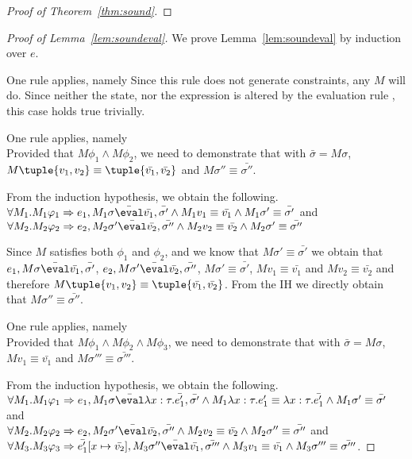

\begin{proof}[Proof of Theorem~\ref{thm:sound}]
\end{proof}

\begin{proof}[Proof of Lemma~\ref{lem:soundeval}]
  We prove Lemma~\ref{lem:soundeval} by induction over $e$.

  {One rule applies, namely 
  Since this rule does not generate constraints, any $M$ will do.
  Since neither the state, nor the expression is altered by the evaluation rule ,
  this case holds true trivially.
  }

  {One rule applies, namely \\
  Provided that $M\phi_1\wedge M\phi_2$,
  we need to demonstrate that   with $\bar{\sigma}=M\sigma$,
  $M\tuple{v_1,v_2} \equiv \tuple{\bar{v_1},\bar{v_2}}$ and $M\sigma''\equiv\bar{\sigma''}$.

  From the induction hypothesis, we obtain the following.\\
  $\forall M_1 .  M_1\phi_1 \implies e_1, M_1\sigma \bar{\eval}\bar{v_1},\bar{\sigma'}\land  M_1v_1\equiv \bar{v_1} \land  M_1\sigma'\equiv\bar{\sigma'}$ and
  $\forall M_2 . M_2\phi_2 \implies e_2,M_2\sigma' \bar{\eval}\bar{v_2},\bar{\sigma''}\land M_2v_2\equiv \bar{v_2} \wedge M_2\sigma'\equiv\bar{\sigma''}$

  Since $M$ satisfies both $\phi_1$ and $\phi_2$,
  and we know that $M\sigma'\equiv \bar{\sigma'}$
  we obtain that $e_1,M\sigma \bar{\eval}\bar{v_1},\bar{\sigma'}$,
  $e_2,M\sigma'\bar{\eval}\bar{v_2},\bar{\sigma''}$, $M\sigma'\equiv \bar{\sigma'}$,
 $M v_1\equiv \bar{v_1}$ and $M v_2 \equiv \bar{v_2}$ and therefore $M\tuple{v_1,v_2} \equiv \tuple{\bar{v_1},\bar{v_2}}$.
  From the IH we directly obtain that $M \sigma'' \equiv\bar{\sigma''}$.
  }

  {One rule applies, namely \\
  Provided that $M\phi_1 \land M\phi_2\land M\phi_3$,
  we need to demonstrate that
   with $\bar{\sigma}=M\sigma$,
   $M v_1 \equiv \bar{v_1}$ and $M\sigma'''\equiv\bar{\sigma'''}$.

  From the induction hypothesis, we obtain the following.\\
  $\forall M_1 . M_1\phi_1 \implies e_1,M_1\sigma\bar{\eval}\lambda x : \tau.\bar{e_1'},\bar{\sigma'}
  \land M_1\lambda x : \tau.e_1' \equiv \lambda x : \tau.\bar{e_1'} \land M_1\sigma'\equiv\bar{\sigma'}$
  and\\
  $\forall M_2 . M_2\phi_2 \implies e_2,M_2\sigma'\bar{\eval}\bar{v_2},\bar{\sigma''}
  \land M_2 v_2 \equiv \bar{v_2} \land M_2\sigma'' \equiv\bar{\sigma''}$
  and\\
  $\forall M_3 . M_3\phi_3 \implies \bar{e_1'}[x\mapsto \bar{v_2}],M_3\sigma''\bar{\eval}\bar{v_1},\bar{\sigma'''}
  \land M_3 v_1\equiv \bar{v_1} \land M_3 \sigma'''\equiv\bar{\sigma'''}$.

}
\end{proof}
